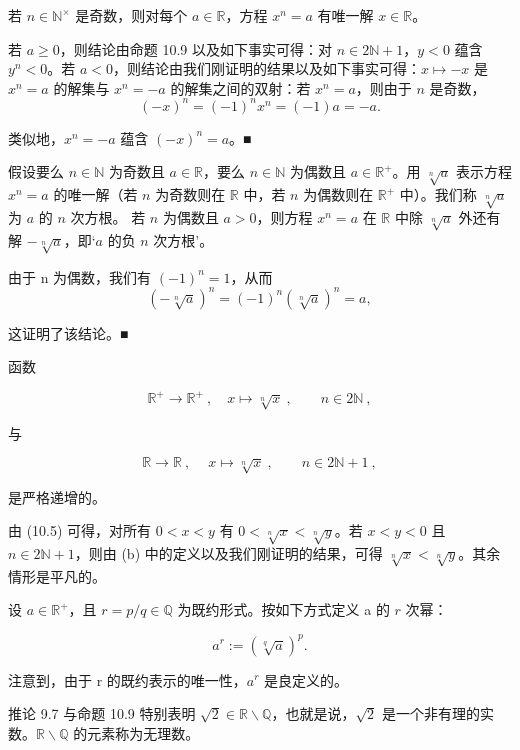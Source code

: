 \begin{remark}

\begin{items}
\item

若 $ n \in \mathbb{N}^\times $ 是奇数，则对每个 $ a \in \mathbb{R} $，方程 $ x^n = a $ 有唯一解 $ x \in \mathbb{R} $。

\proofhead
若 $ a \geq 0 $，则结论由命题 10.9 以及如下事实可得：对 $ n \in 2\mathbb{N} + 1 $，$ y < 0 $ 蕴含 $ y^n < 0 $。若 $ a < 0 $，则结论由我们刚证明的结果以及如下事实可得：$ x \mapsto -x $ 是 $ x^n = a $ 的解集与 $ x^n = -a $ 的解集之间的双射：若 $ x^n = a $，则由于 $ n $ 是奇数，
\[
\left(-x\right)^{n}=\left(-1\right)^{n}x^{n}=(-1)a=-a.
\]

类似地，$ x^{n} = -a $ 蕴含 $ (-x)^{n} = a $。■

\item

假设要么 $ n \in \mathbb{N} $ 为奇数且 $ a \in \mathbb{R} $，要么 $ n \in \mathbb{N} $ 为偶数且 $ a \in \mathbb{R}^+ $。用 $ \sqrt[n]{a} $ 表示方程 $ x^n = a $ 的唯一解（若 $ n $ 为奇数则在 $ \mathbb{R} $ 中，若 $ n $ 为偶数则在 $ \mathbb{R}^+ $ 中）。我们称 $ \sqrt[n]{a} $ 为 $ a $ 的 $ n $ 次方根。
若 $ n $ 为偶数且 $ a>0 $，则方程 $ x^n=a $ 在 $ \mathbb{R} $ 中除 $ \sqrt[n]{a} $ 外还有解 $ -\sqrt[n]{a} $，即‘$ a $ 的负 $ n $ 次方根’。

\proofhead
由于 n 为偶数，我们有 $ (-1)^{n}=1 $，从而
\[
\left(-\sqrt[n]{a}\right)^{n}=\left(-1\right)^{n}\left(\sqrt[n]{a}\right)^{n}=a,
\]

这证明了该结论。■

\item

函数

\[
\mathbb{R}^{+}\to\mathbb{R}^{+}~,\quad x\mapsto\sqrt[n]{x}~,\qquad n\in2\mathbb{N}~,
\]

与

\[
\mathbb{R}\to\mathbb{R}~,\quad{~x\mapsto\sqrt[n]{x}~},\qquad n\in2\mathbb{N}+1~,
\]

是严格递增的。

\proofhead
由 (10.5) 可得，对所有 $ 0 < x < y $ 有 $ 0 < \sqrt[n]{x} < \sqrt[n]{y} $。若 $ x < y < 0 $ 且 $ n \in 2\mathbb{N} + 1 $，则由 (b) 中的定义以及我们刚证明的结果，可得 $ \sqrt[n]{x} < \sqrt[n]{y} $。其余情形是平凡的。
\item

设 $ a \in \mathbb{R}^+ $，且 $ r = p/q \in \mathbb{Q} $ 为既约形式。按如下方式定义 a 的 $ r $ 次幂：

\[
a^{r}:=\left(\sqrt[q]{a}\right)^{p}.
\]

注意到，由于 r 的既约表示的唯一性，$ a^{r} $ 是良定义的。

\item

推论 9.7 与命题 10.9 特别表明 $ \sqrt{2} \in \mathbb{R} \backslash \mathbb{Q} $，也就是说，$ \sqrt{2} $ 是一个非有理的实数。$ \mathbb{R} \backslash \mathbb{Q} $ 的元素称为无理数。

\end{items}

\end{remark}

